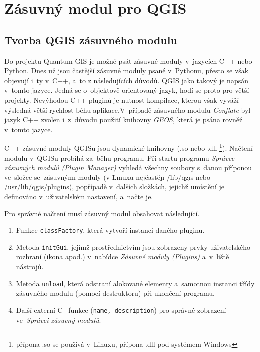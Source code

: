 \chapter{Zásuvný modul pro QGIS}
\label{6-plugin}

\section{Tvorba QGIS zásuvného modulu}
\label{plugin-tvorba}

Do projektu Quantum GIS je možné psát zásuvné moduly v~jazycích C++ nebo Python.
Dnes už jsou častější zásuvné moduly psané v~Pythonu, přesto se však objevují
i~ty v~C++, a~to z následujících důvodů. QGIS jako takový je napsán v~tomto 
jazyce. Jedná se o~objektově orientovaný jazyk, hodí se proto pro větší projekty. 
Nevýhodou C++ pluginů je nutnost kompilace, kterou však vyváží výsledná větší 
rychlost běhu aplikace.V~případě zásuvného modulu \textit{Conflate} byl jazyk 
C++ zvolen i~z~důvodu použití knihovny \textit{GEOS}, která je psána rovněž 
v~tomto jazyce.


C++ zásuvné moduly QGISu jsou dynamické knihovny (.so nebo .dll
\footnote{ přípona .so se používá v~Linuxu, přípona .dll pod systémem Windows}).
Načtení modulu v~QGISu probíhá za~běhu programu. Při startu programu 
\textit{Správce zásuvných modulů (Plugin Manager)} vyhledá všechny soubory 
s~danou příponou ve~složce se~zásuvnými moduly (v Linuxu nejčastěji /lib/qgis
nebo /usr/lib/qgis/plugins), popřípadě v~dalších složkách, jejichž umístění
je definováno v~uživatelském nastavení, a~načte je.

Pro správné načtení musí zásuvný modul obsahovat následující.

\begin{enumerate}
 \item Funkce \texttt{classFactory}, která vytvoří instanci daného pluginu.
 \item Metoda \texttt{initGui}, jejímž prostřednictvím jsou zobrazeny prvky 
	uživatelského rozhraní (ikona apod.) v~nabídce \textit{Zásuvné moduly 
	(Plugins)} a~v~liště nástrojů.
 \item Metoda \texttt{unload}, která odstraní alokované elementy a~samotnou
	instanci třídy zásuvného modulu (pomocí destruktoru) při ukončení 
	programu.
 \item Další externí C ~funkce (\texttt{na\-me, descrip\-tion}) pro správné
	zobrazení ve~\textit{Správci zásuvný modulů}.
\end{enumerate}

